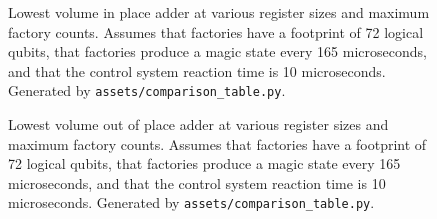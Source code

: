 \documentclass[onecolumn,unpublished]{quantumarticle}
\theoremstyle{definition}
\theoremstyle{definition}
\theoremstyle{definition}
\begin{document}
\begin{figure}
    \centering
    \caption{
        Lowest volume in place adder at various register sizes and maximum factory counts.
        Assumes that factories have a footprint of 72 logical qubits, that factories produce a magic state every 165 microseconds, and that the control system reaction time is 10 microseconds.
        Generated by \texttt{assets/comparison\_table.py}.
    }
    \label{fig:minif}
\end{figure}

\begin{figure}
    \centering
    \caption{
        Lowest volume out of place adder at various register sizes and maximum factory counts.
        Assumes that factories have a footprint of 72 logical qubits, that factories produce a magic state every 165 microseconds, and that the control system reaction time is 10 microseconds.
        Generated by \texttt{assets/comparison\_table.py}.
    }
    \label{fig:minof}
\end{figure}
\end{document}
